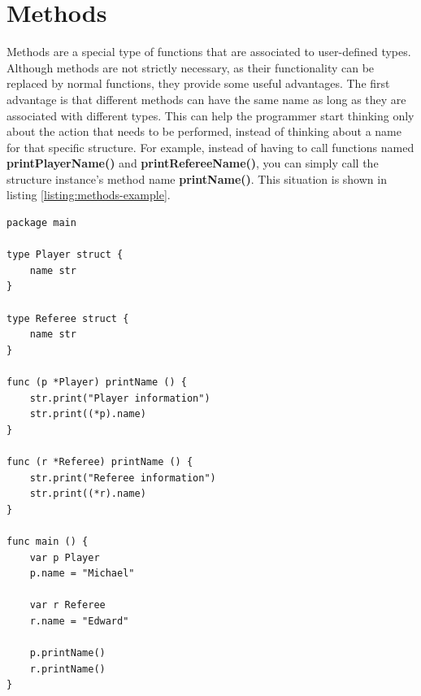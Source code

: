 \documentclass[11pt,fleqn,openany]{book} %
\begin{document}

\section{Methods}


Methods are a special type of functions that are associated to user-defined types. Although methods are not strictly necessary, as their functionality can be replaced by normal functions, they provide some useful advantages. The first advantage is that different methods can have the same name as long as they are associated with different types. This can help the programmer start thinking only about the action that needs to be performed, instead of thinking about a name for that specific structure. For example, instead of having to call functions named \textbf{printPlayerName()} and \textbf{printRefereeName()}, you can simply call the structure instance's method name \textbf{printName()}. This situation is shown in listing \ref{listing:methods-example}.


\begin{lstlisting}[caption={Methods example},captionpos=b,label={listing:methods-example}]
package main

type Player struct {
	name str
}

type Referee struct {
	name str
}

func (p *Player) printName () {
	str.print("Player information")
	str.print((*p).name)
}

func (r *Referee) printName () {
	str.print("Referee information")
	str.print((*r).name)
}

func main () {
	var p Player
	p.name = "Michael"
    
    var r Referee
    r.name = "Edward"

	p.printName()
    r.printName()
}
\end{lstlisting}
\end{document}
